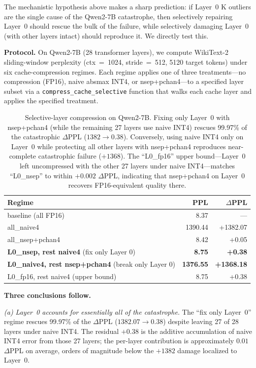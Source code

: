 \documentclass[11pt]{article}
\begin{document}
The mechanistic hypothesis above makes a sharp prediction: if Layer~0 K outliers are the single cause of the Qwen2-7B catastrophe, then selectively repairing Layer~0 should rescue the bulk of the failure, while selectively damaging Layer~0 (with other layers intact) should reproduce it. We directly test this.

\textbf{Protocol.} On Qwen2-7B (28 transformer layers), we compute WikiText-2 sliding-window perplexity (ctx~=~1024, stride~=~512, 5120 target tokens) under six cache-compression regimes. Each regime applies one of three treatments---no compression (FP16), naive absmax INT4, or nsep+pchan4---to a specified layer subset via a \texttt{compress\_cache\_selective} function that walks each cache layer and applies the specified treatment.

\begin{table}[h]
\centering
\small
\begin{tabular}{lrr}
\toprule
Regime & PPL & $\Delta$PPL \\
\midrule
baseline (all FP16) & 8.37 & --- \\
all\_naive4 & 1390.44 & +1382.07 \\
all\_nsep+pchan4 & 8.42 & +0.05 \\
\midrule
\textbf{L0\_nsep, rest naive4} (fix only Layer 0) & \textbf{8.75} & \textbf{+0.38} \\
\textbf{L0\_naive4, rest nsep+pchan4} (break only Layer 0) & \textbf{1376.55} & \textbf{+1368.18} \\
L0\_fp16, rest naive4 (upper bound) & 8.75 & +0.38 \\
\bottomrule
\end{tabular}
\caption{Selective-layer compression on Qwen2-7B. Fixing only Layer~0 with nsep+pchan4 (while the remaining 27 layers use naive INT4) rescues 99.97\% of the catastrophic $\Delta$PPL ($1382 \to 0.38$). Conversely, using naive INT4 only on Layer~0 while protecting all other layers with nsep+pchan4 reproduces near-complete catastrophic failure ($+1368$). The ``L0\_fp16'' upper bound---Layer~0 left uncompressed with the other 27 layers under naive INT4---matches ``L0\_nsep'' to within $+0.002$ $\Delta$PPL, indicating that nsep+pchan4 on Layer~0 recovers FP16-equivalent quality there.}
\label{tab:layer0_causality}
\end{table}

\textbf{Three conclusions follow.}

\emph{(a) Layer~0 accounts for essentially all of the catastrophe.} The ``fix only Layer~0'' regime rescues 99.97\% of the $\Delta$PPL ($1382.07 \to 0.38$) despite leaving 27 of 28 layers under naive INT4. The residual $+0.38$ is the additive accumulation of naive INT4 error from those 27 layers; the per-layer contribution is approximately $0.01$ $\Delta$PPL on average, orders of magnitude below the $+1382$ damage localized to Layer~0.
\end{document}
